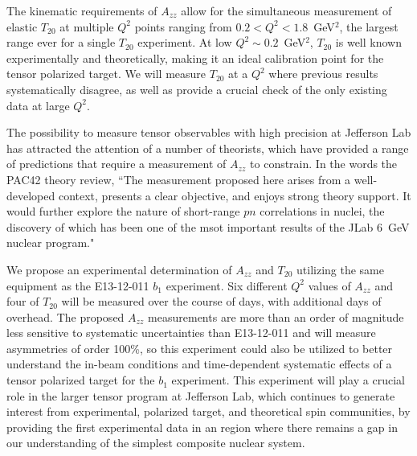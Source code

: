 The kinematic requirements of $A_{zz}$ allow for the simultaneous measurement of elastic $T_{20}$ at multiple $Q^2$ points ranging from $0.2<Q^2<1.8$~GeV$^2$, the largest range ever for a single $T_{20}$ experiment. At low $Q^2\sim0.2$~GeV$^2$, $T_{20}$ is well known experimentally and theoretically, making it an ideal calibration point for the tensor polarized target. We will measure $T_{20}$ at a $Q^2$ where previous results systematically disagree, as well as provide a crucial check of the only existing data at large $Q^2$.



The possibility to measure tensor observables with high precision at Jefferson Lab has attracted the attention of a number of theorists, which have provided a range of predictions that require a measurement of $A_{zz}$ to constrain. 
In the words the PAC42 theory review, ``The measurement proposed here arises from a well-developed context, presents a clear objective, and enjoys strong theory support. It would further explore the nature of short-range $pn$ correlations in nuclei, the discovery of which has been one of the msot important results of the JLab 6~GeV nuclear program." 

We propose an experimental determination of $A_{zz}$ and $T_{20}$ utilizing the same equipment as the E13-12-011 $b_1$ experiment.  Six different $Q^2$ values of $A_{zz}$ and four of $T_{20}$ will be measured over the course of \productiondays days, with \overheaddays additional days of overhead. The proposed $A_{zz}$ measurements are more than an order of magnitude less sensitive to systematic uncertainties than E13-12-011 and will measure asymmetries of order 100\%, so this experiment could also be utilized to better understand the in-beam conditions and time-dependent systematic effects of a tensor polarized target for the $b_1$ experiment. This experiment will play a crucial role in the larger tensor program at Jefferson Lab, which continues to generate interest from experimental, polarized target, and theoretical spin communities, by providing the first experimental data in an region where there remains a gap in our understanding of the simplest composite nuclear system.









